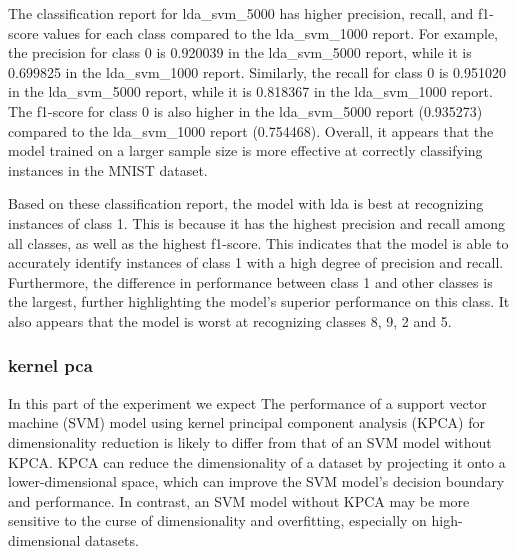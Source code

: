 The classification report for lda_svm_5000 has higher precision, recall, and f1-score values for each class compared to the lda_svm_1000 report. For example, the precision for class 0 is 0.920039 in the lda_svm_5000 report, while it is 0.699825 in the lda_svm_1000 report. Similarly, the recall for class 0 is 0.951020 in the lda_svm_5000 report, while it is 0.818367 in the lda_svm_1000 report. The f1-score for class 0 is also higher in the lda_svm_5000 report (0.935273) compared to the lda_svm_1000 report (0.754468). Overall, it appears that the model trained on a larger sample size is more effective at correctly classifying instances in the MNIST dataset.

Based on these classification report, the model with lda is best at recognizing instances of class 1. This is because it has the highest precision and recall among all classes, as well as the highest f1-score. This indicates that the model is able to accurately identify instances of class 1 with a high degree of precision and recall. Furthermore, the difference in performance between class 1 and other classes is the largest, further highlighting the model's superior performance on this class. It also appears that the model is worst at recognizing classes 8, 9, 2 and 5.

\subsubsection{\gls{kernel pca}}\label{subsubsec:experiment_4_kernel_pca}
In this part of the experiment we expect The performance of a support vector machine (SVM) model using kernel principal component analysis (KPCA) for dimensionality reduction is likely to differ from that of an SVM model without KPCA. KPCA can reduce the dimensionality of a dataset by projecting it onto a lower-dimensional space, which can improve the SVM model's decision boundary and performance. In contrast, an SVM model without KPCA may be more sensitive to the curse of dimensionality and overfitting, especially on high-dimensional datasets. 


